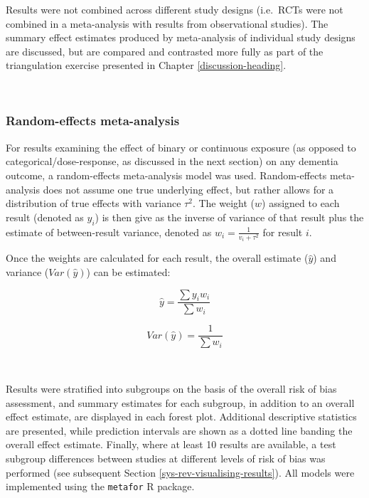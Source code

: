 \documentclass[a4paper, twoside]{templates/ociamthesis}
\begin{document}
Results were not combined across different study designs (i.e.~RCTs were not combined in a meta-analysis with results from observational studies). The summary effect estimates produced by meta-analysis of individual study designs are discussed, but are compared and contrasted more fully as part of the triangulation exercise presented in Chapter \ref{discussion-heading}.

~

\hypertarget{random-effects-meta-analysis}{%
\subsubsection{Random-effects meta-analysis}\label{random-effects-meta-analysis}}

For results examining the effect of binary or continuous exposure (as opposed to categorical/dose-response, as discussed in the next section) on any dementia outcome, a random-effects meta-analysis model was used. Random-effects meta-analysis does not assume one true underlying effect, but rather allows for a distribution of true effects with variance \(\tau^2\). The weight (\(w\)) assigned to each result (denoted as \(y_i\)) is then give as the inverse of variance of that result plus the estimate of between-result variance, denoted as \(w_i = \frac{1}{v_i+\tau^2}\) for result \(i\).

Once the weights are calculated for each result, the overall estimate (\(\hat{y}\)) and variance (\(Var(\hat{y})\)) can be estimated:

\begin{equation}
\hat{y} = \frac{\sum{y_iw_i}}{\sum{w_i}}
  \label{eq:rmaEstimate}
\end{equation}

\begin{equation}
Var(\hat{y}) = \frac{1}{\sum{w_i}}
  \label{eq:rmaVariance}
\end{equation}

~

Results were stratified into subgroups on the basis of the overall risk of bias assessment, and summary estimates for each subgroup, in addition to an overall effect estimate, are displayed in each forest plot. Additional descriptive statistics are presented, while prediction intervals are shown as a dotted line banding the overall effect estimate. Finally, where at least 10 results are available, a test subgroup differences between studies at different levels of risk of bias was performed (see subsequent Section \ref{sys-rev-visualising-results}). All models were implemented using the \texttt{metafor} R package.
\end{document}
